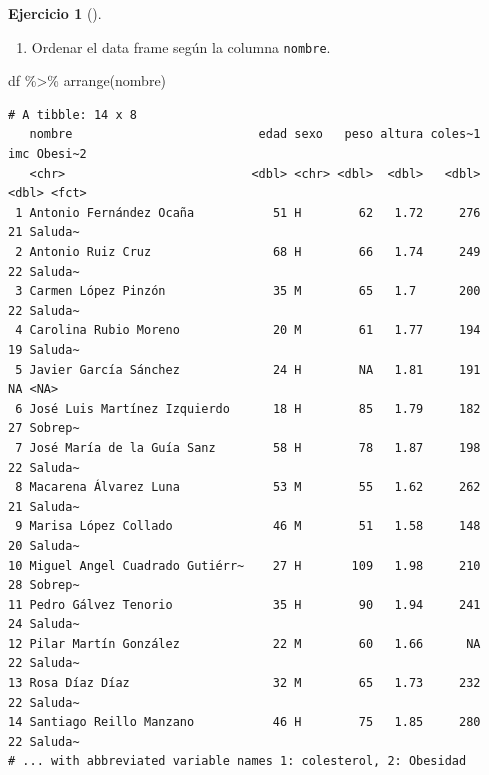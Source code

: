 \documentclass[
  a4paper,
]{scrreport}
\newenvironment{Shaded}{\begin{snugshade}}{\end{snugshade}}
\newcommand{\FunctionTok}[1]{\textcolor[rgb]{0.28,0.35,0.67}{#1}}
\newcommand{\NormalTok}[1]{\textcolor[rgb]{0.00,0.23,0.31}{#1}}
\newcommand{\SpecialCharTok}[1]{\textcolor[rgb]{0.37,0.37,0.37}{#1}}
\providecommand{\tightlist}{%
  \setlength{\itemsep}{0pt}\setlength{\parskip}{0pt}}\usepackage{longtable,booktabs,array}
\theoremstyle{definition}
\newtheorem{exercise}{Ejercicio}[chapter]
\theoremstyle{remark}
\begin{document}
\begin{exercise}[]
\begin{tcolorbox}
\end{tcolorbox}

\begin{enumerate}
\def\labelenumi{\alph{enumi}.}
\setcounter{enumi}{9}
\tightlist
\item
  Ordenar el data frame según la columna \texttt{nombre}.
\end{enumerate}

\begin{tcolorbox}[enhanced jigsaw, rightrule=.15mm, toptitle=1mm, colbacktitle=quarto-callout-tip-color!10!white, titlerule=0mm, colback=white, leftrule=.75mm, bottomtitle=1mm, colframe=quarto-callout-tip-color-frame, breakable, title=\textcolor{quarto-callout-tip-color}{\faLightbulb}\hspace{0.5em}{Solución}, arc=.35mm, coltitle=black, opacityback=0, bottomrule=.15mm, opacitybacktitle=0.6, left=2mm, toprule=.15mm]

\begin{Shaded}
\begin{Highlighting}[]
\NormalTok{df }\SpecialCharTok{\%\textgreater{}\%}
    \FunctionTok{arrange}\NormalTok{(nombre)}
\end{Highlighting}
\end{Shaded}

\begin{verbatim}
# A tibble: 14 x 8
   nombre                          edad sexo   peso altura coles~1   imc Obesi~2
   <chr>                          <dbl> <chr> <dbl>  <dbl>   <dbl> <dbl> <fct>  
 1 Antonio Fernández Ocaña           51 H        62   1.72     276    21 Saluda~
 2 Antonio Ruiz Cruz                 68 H        66   1.74     249    22 Saluda~
 3 Carmen López Pinzón               35 M        65   1.7      200    22 Saluda~
 4 Carolina Rubio Moreno             20 M        61   1.77     194    19 Saluda~
 5 Javier García Sánchez             24 H        NA   1.81     191    NA <NA>   
 6 José Luis Martínez Izquierdo      18 H        85   1.79     182    27 Sobrep~
 7 José María de la Guía Sanz        58 H        78   1.87     198    22 Saluda~
 8 Macarena Álvarez Luna             53 M        55   1.62     262    21 Saluda~
 9 Marisa López Collado              46 M        51   1.58     148    20 Saluda~
10 Miguel Angel Cuadrado Gutiérr~    27 H       109   1.98     210    28 Sobrep~
11 Pedro Gálvez Tenorio              35 H        90   1.94     241    24 Saluda~
12 Pilar Martín González             22 M        60   1.66      NA    22 Saluda~
13 Rosa Díaz Díaz                    32 M        65   1.73     232    22 Saluda~
14 Santiago Reillo Manzano           46 H        75   1.85     280    22 Saluda~
# ... with abbreviated variable names 1: colesterol, 2: Obesidad
\end{verbatim}


\end{tcolorbox}
\end{exercise}
\end{document}
